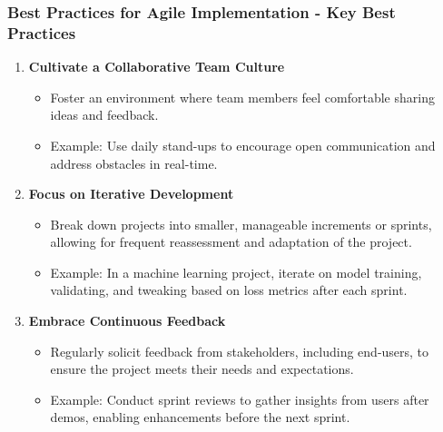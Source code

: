 \documentclass{beamer}
\begin{document}
\begin{frame}[fragile]
    \frametitle{Best Practices for Agile Implementation - Key Best Practices}
    \begin{enumerate}
        \item \textbf{Cultivate a Collaborative Team Culture}
            \begin{itemize}
                \item Foster an environment where team members feel comfortable sharing ideas and feedback.
                \item Example: Use daily stand-ups to encourage open communication and address obstacles in real-time.
            \end{itemize}
        
        \item \textbf{Focus on Iterative Development}
            \begin{itemize}
                \item Break down projects into smaller, manageable increments or sprints, allowing for frequent reassessment and adaptation of the project.
                \item Example: In a machine learning project, iterate on model training, validating, and tweaking based on loss metrics after each sprint.
            \end{itemize}
        
        \item \textbf{Embrace Continuous Feedback}
            \begin{itemize}
                \item Regularly solicit feedback from stakeholders, including end-users, to ensure the project meets their needs and expectations.
                \item Example: Conduct sprint reviews to gather insights from users after demos, enabling enhancements before the next sprint.
            \end{itemize}
    \end{enumerate}
\end{frame}
\end{document}
